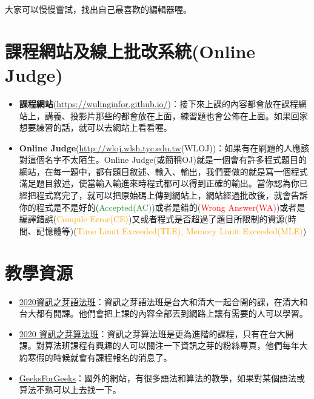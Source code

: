 \documentclass[a4paper, 11pt, oneside]{book}
\begin{document}
大家可以慢慢嘗試，找出自己最喜歡的編輯器喔。



\section{課程網站及線上批改系統(Online Judge)}
\begin{itemize}
	\item \textbf{課程網站}(\url{https://wulinginfor.github.io/})：接下來上課的內容都會放在課程網站上，講義、投影片那些的都會放在上面，練習題也會公佈在上面。如果回家想要練習的話，就可以去網站上看看喔。
	\item \textbf{Online Judge}(\url{http://wloj.wlsh.tyc.edu.tw}(WLOJ))：如果有在刷題的人應該對這個名字不太陌生。Online Judge(或簡稱OJ)就是一個會有許多程式題目的網站，在每一題中，都有題目敘述、輸入、輸出，我們要做的就是寫一個程式滿足題目敘述，使當輸入輸進來時程式都可以得到正確的輸出。當你認為你已經把程式寫完了，就可以把原始碼上傳到網站上，網站經過批改後，就會告訴你的程式是不是好的(\textcolor{ForestGreen}{Accepted(AC)})或者是錯的(\textcolor{red}{Wrong Answer(WA)})或者是編譯錯誤(\textcolor{orange}{Compile Error(CE)})又或者程式是否超過了題目所限制的資源(時間、記憶體等)(\textcolor{orange}{Time Limit Exceeded(TLE), Memory Limit Exceeded(MLE)})
\end{itemize}

\section{教學資源}
\begin{itemize}
\item \href{https://tw-csie-sprout.github.io/c2020/#!index.md}{\underline{2020資訊之芽語法班}}：資訊之芽語法班是台大和清大一起合開的課，在清大和台大都有開課。他們會把上課的內容全部丟到網路上讓有需要的人可以學習。
\item \href{https://www.csie.ntu.edu.tw/~sprout/algo2020/}{\underline{2020 資訊之芽算法班}}：資訊之芽算法班是更為進階的課程，只有在台大開課。對算法班課程有興趣的人可以關注一下資訊之芽的粉絲專頁，他們每年大約寒假的時候就會有課程報名的消息了。
\item \href{www.geeksforgeeks.org}{\underline{GeeksForGeeks}}：國外的網站，有很多語法和算法的教學，如果對某個語法或算法不熟可以上去找一下。
\end{itemize}
\end{document}
